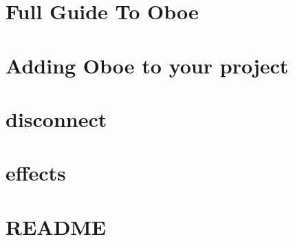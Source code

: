 \let\mypdfximage\pdfximage\def\pdfximage{\immediate\mypdfximage}\documentclass[twoside]{book}
\newcommand{\+}{\discretionary{\mbox{\scriptsize$\hookleftarrow$}}{}{}}
\begin{document}
\chapter{Full Guide To Oboe}
\label{md__c_1__users_fab_src__github_branches__neural_amp_modeler_plugin_i_plug2__dependencies__build_c235f34687cc42af9cfb508630818f43}

\chapter{Adding Oboe to your project}
\label{md__c_1__users_fab_src__github_branches__neural_amp_modeler_plugin_i_plug2__dependencies__build_3f6f4809ba828bc1df61efe12b60a32b}

\chapter{disconnect}
\label{md__c_1__users_fab_src__github_branches__neural_amp_modeler_plugin_i_plug2__dependencies__build_0be528d3a9dedb1839ea1b9bef5f3272}

\chapter{effects}
\label{md__c_1__users_fab_src__github_branches__neural_amp_modeler_plugin_i_plug2__dependencies__build_d72b592879c39cb34b6ca320b132a5b7}

\chapter{R\+E\+A\+D\+ME}
\label{md__c_1__users_fab_src__github_branches__neural_amp_modeler_plugin_i_plug2__dependencies__build_51041430713ffcc370ade73b66baf7e9}

\end{document}
